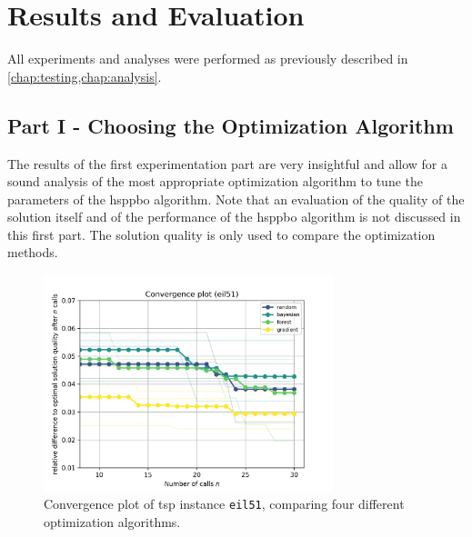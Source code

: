 

\chapter{Results and Evaluation}
\label{chap:results}

All experiments and analyses were performed as previously described in \cref{chap:testing,chap:analysis}. 

\section{Part I - Choosing the Optimization Algorithm}
\label{chap:part1}
The results of the first experimentation part are very insightful and allow for a sound analysis of the most appropriate optimization algorithm to tune the parameters of the \gls{hsppbo} algorithm. Note that an evaluation of the quality of the solution itself and of the performance of the \gls{hsppbo} algorithm is not discussed in this first part. The solution quality is only used to compare the optimization methods. 

\begin{figure}[h]
	\centering
	\includegraphics[width=0.75\textwidth]{results/part1/convergence_eil51.png}
	\caption[Convergence plot of \gls{tsp} instance \texttt{eil51}]{Convergence plot of \gls{tsp} instance \texttt{eil51}, comparing four different optimization algorithms.}
	\label{fig:convergence_eil51}
\end{figure}

